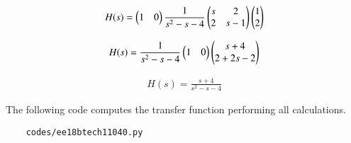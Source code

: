 \begin{enumerate}[label=\thesubsection.\arabic*.,ref=\thesubsection.\theenumi]
\begin{align}
    H(s) = \begin{pmatrix}1&0\end{pmatrix}\frac{1}{s^2 -s - 4}\begin{pmatrix} s&2\\ 2&s-1\end{pmatrix}\begin{pmatrix} 1\\2\end{pmatrix}
\end{align}

\begin{align}
    H(s) = \frac{1}{s^2 -s - 4}\begin{pmatrix}1&0\end{pmatrix}\begin{pmatrix} s+4\\ 2+2s-2 \end{pmatrix}
\end{align}

\begin{align}
    H(s) = \frac{s +4}{s^2 - s - 4}
\end{align}

The following code computes the transfer function performing all calculations. 
\begin{lstlisting}
    codes/ee18btech11040.py
\end{lstlisting}


\end{enumerate}
